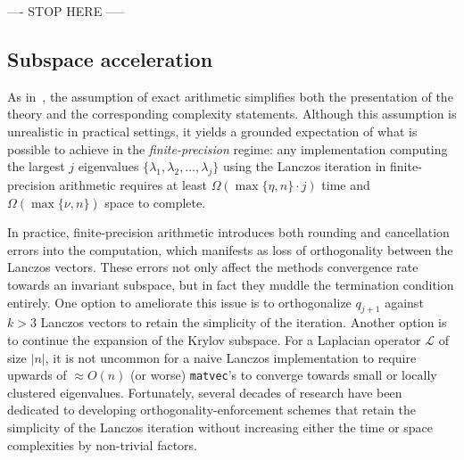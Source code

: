\documentclass[10pt]{article}
\numberwithin{equation}{section}
\newcommand{\+}{%
	\raisebox{0.18ex}{\scaleobj{0.55}{+}}
}
\theoremstyle{definition}
\theoremstyle{definition}
\begin{document}
---- STOP HERE ----- 

\subsection*{Subspace acceleration}
\noindent As in~\cite{parlett1994we}, the assumption of exact arithmetic simplifies both the presentation of the theory and the corresponding complexity statements. 
Although this assumption is unrealistic in practical settings, it yields a grounded expectation of what is possible to achieve in the \emph{finite-precision} regime: any implementation computing the largest $j$ eigenvalues $\{ \lambda_1, \lambda_2, \dots, \lambda_j \}$ using the Lanczos iteration in finite-precision arithmetic requires at least $\Omega(\max\{\eta, n\} \cdot j)$ time and $\Omega(\max\{\nu, n\})$ space to complete. 

In practice, finite-precision arithmetic introduces both rounding and cancellation errors into the computation, which manifests as loss of orthogonality between the Lanczos vectors. These errors not only affect the methods convergence rate towards an invariant subspace, but in fact they muddle the termination condition entirely. 
One option to ameliorate this issue is to orthogonalize $q_{j+1}$ against $k > 3$ Lanczos vectors to  retain the simplicity of the iteration. Another option is to continue the expansion of the Krylov subspace. 
For a Laplacian operator $\mathcal{L}$ of size $\lvert n \rvert$, it is not uncommon for a naive Lanczos implementation to require upwards of $\approx O(n)$ (or worse) \texttt{matvec}'s to converge towards small or locally clustered eigenvalues.
Fortunately, several decades of research have been dedicated to developing orthogonality-enforcement schemes that retain the simplicity of the Lanczos iteration without increasing either the time or space complexities by non-trivial factors. 

\end{document}
